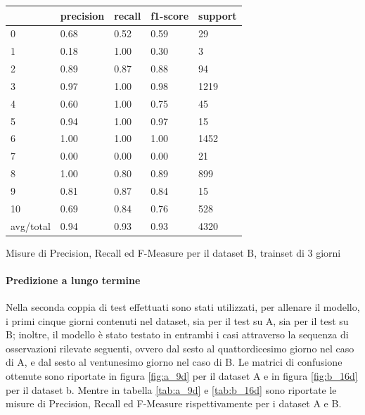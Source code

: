 \documentclass[10pt,a4paper]{article}
\begin{document}
	\begin{table}[!htbp]
    \scriptsize
    \centering
    	\begin{tabularx}{0.56\textwidth}{l | llll}
    		{} & {precision} & {recall} & {f1-score} & {support} \\
    		\midrule
            {0} & {0.68} & {0.52} & {0.59} & {29} \\
            {1} & {0.18} & {1.00} & {0.30} & {3} \\
            {2} & {0.89} & {0.87} & {0.88} & {94} \\
            {3} & {0.97} & {1.00} & {0.98} & {1219} \\
            {4} & {0.60} & {1.00} & {0.75} & {45} \\
            {5} & {0.94} & {1.00} & {0.97} & {15} \\
            {6} & {1.00} & {1.00} & {1.00} & {1452} \\
            {7} & {0.00} & {0.00} & {0.00} & {21} \\
            {8} & {1.00} & {0.80} & {0.89} & {899} \\
            {9} & {0.81} & {0.87} & {0.84} & {15} \\
            {10} & {0.69} & {0.84} & {0.76} & {528} \\
            {avg/total} & {0.94} & {0.93} & {0.93} & {4320} \\
    	\end{tabularx}
    	 {Misure di Precision, Recall ed F-Measure per il dataset B, trainset di 3 giorni}
    	\label{tab:b_3d}
    \end{table}



	\paragraph{Predizione a lungo termine}

	Nella seconda coppia di test effettuati sono stati utilizzati, per allenare il modello, i primi cinque giorni contenuti nel dataset, sia per il test su A, sia per il test su B; inoltre, il modello è stato testato in entrambi i casi attraverso la sequenza di osservazioni rilevate seguenti, ovvero dal sesto al quattordicesimo giorno nel caso di A, e dal sesto al ventunesimo giorno nel caso di B. Le matrici di confusione ottenute sono riportate in figura \ref{fig:a_9d} per il dataset A e in figura \ref{fig:b_16d} per il dataset b. Mentre in tabella \ref{tab:a_9d} e \ref{tab:b_16d} sono riportate le misure di Precision, Recall ed F-Measure rispettivamente per i dataset A e B.
\end{document}
